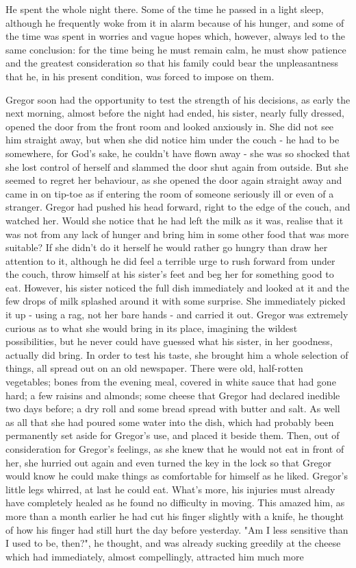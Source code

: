 \documentclass[12pt]{book}
\begin{document}
    He spent the whole night there. Some of the time he passed in a light sleep, although he frequently woke from it in alarm because of his hunger, and some of the time was spent in worries and vague hopes which, however, always led to the same conclusion: for the time being he must remain calm, he must show patience and the greatest consideration so that his family could bear the unpleasantness that he, in his present condition, was forced to impose on them.

    Gregor soon had the opportunity to test the strength of his decisions, as early the next morning, almost before the night had ended, his sister, nearly fully dressed, opened the door from the front room and looked anxiously in. She did not see him straight away, but when she did notice him under the couch - he had to be somewhere, for God's sake, he couldn't have flown away - she was so shocked that she lost control of herself and slammed the door shut again from outside. But she seemed to regret her behaviour, as she opened the door again straight away and came in on tip-toe as if entering the room of someone seriously ill or even of a stranger. Gregor had pushed his head forward, right to the edge of the couch, and watched her. Would she notice that he had left the milk as it was, realise that it was not from any lack of hunger and bring him in some other food that was more suitable? If she didn't do it herself he would rather go hungry than draw her attention to it, although he did feel a terrible urge to rush forward from under the couch, throw himself at his sister's feet and beg her for something good to eat. However, his sister noticed the full dish immediately and looked at it and the few drops of milk splashed around it with some surprise. She immediately picked it up - using a rag, not her bare hands - and carried it out. Gregor was extremely curious as to what she would bring in its place, imagining the wildest possibilities, but he never could have guessed what his sister, in her goodness, actually did bring. In order to test his taste, she brought him a whole selection of things, all spread out on an old newspaper. There were old, half-rotten vegetables; bones from the evening meal, covered in white sauce that had gone hard; a few raisins and almonds; some cheese that Gregor had declared inedible two days before; a dry roll and some bread spread with butter and salt. As well as all that she had poured some water into the dish, which had probably been permanently set aside for Gregor's use, and placed it beside them. Then, out of consideration for Gregor's feelings, as she knew that he would not eat in front of her, she hurried out again and even turned the key in the lock so that Gregor would know he could make things as comfortable for himself as he liked. Gregor's little legs whirred, at last he could eat. What's more, his injuries must already have completely healed as he found no difficulty in moving. This amazed him, as more than a month earlier he had cut his finger slightly with a knife, he thought of how his finger had still hurt the day before yesterday. "Am I less sensitive than I used to be, then?", he thought, and was already sucking greedily at the cheese which had immediately, almost compellingly, attracted him much more 
\end{document}
